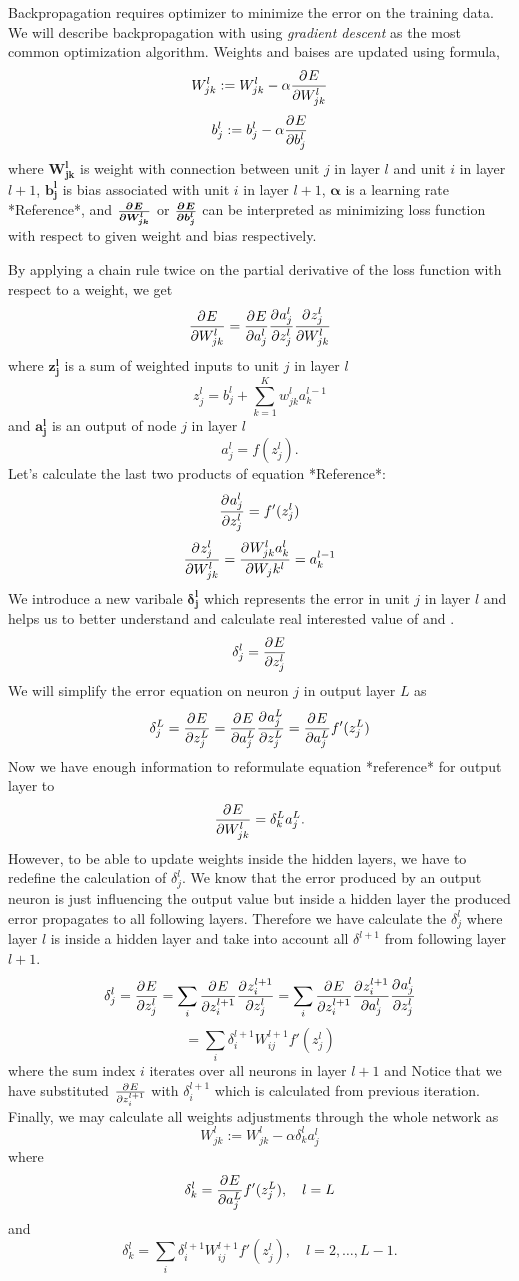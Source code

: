 Backpropagation requires optimizer to minimize the error on the training data.
We will describe backpropagation with using \textit{gradient descent} as the most common optimization algorithm.
\newline
Weights and baises are updated using formula,
\[  W_{jk}^l := W_{jk}^l - \alpha\frac{\partial^{} E}{\partial W_{jk}^l} \]
\[ b_j^l := b_j^l - \alpha\frac{\partial^{} E}{\partial b_j^l} \]
where $\boldsymbol{W_{jk}^l}$ is weight with connection between unit $j$ in layer $l$ and unit $i$ in layer $l+1$, $\boldsymbol{b_j^l}$ is bias associated with unit
$i$ in layer $l+1$, $\boldsymbol{\alpha}$ is a learning rate *Reference*, and $\boldsymbol{\frac{\partial^{} E}{\partial W_{jk}^l}}$ or $\boldsymbol{\frac{\partial^{} E}{\partial b_j^l}}$ can be interpreted as minimizing loss function with respect to given weight and bias respectively.
\par
By applying a chain rule twice on the partial derivative of the loss function with respect to a weight, we get
\[  \frac{\partial^{} E}{\partial W_{jk}^l} = \frac{\partial^{} E}{\partial a_j^l}\frac{\partial^{} a_j^l}{\partial z_j^l}\frac{\partial^{} z_j^l}{\partial W_{jk}^l} \]
where $\boldsymbol{z_j^l}$ is a sum of weighted inputs to unit $j$ in layer $l$
\[  z_j^l =  b_j^l + \sum_{k=1}^K {w_{jk}^l}{a_k^{l-1}}  \]
and $\boldsymbol{a_j^l}$ is an output of node $j$ in layer $l$
\[  a_j^l =  f(z_j^l).  \]
Let's calculate the last two products of equation *Reference*:
\[  \frac{\partial^{} a_j^l}{\partial z_j^l} = f'(z_j^l)  \]
\[  \frac{\partial^{} z_j^l}{\partial W_{jk}^l} = \frac{\partial^{} W_{jk}^{l}a_k^{l}}{\partial W_jk^l} = a_k^{l-1}  \]
We introduce a new varibale $\boldsymbol{\delta_j^l}$ which represents the error in unit $j$ in layer $l$ and helps us to better understand and calculate real interested value of  and .
\[  \delta_j^l = \frac{\partial^{} E}{\partial z_j^l} \]
We will simplify the error equation on neuron $j$ in output layer $L$ as
\[  \delta_j^L = \frac{\partial^{} E}{\partial z_j^L} = \frac{\partial^{} E}{\partial a_j^L}\frac{\partial^{} a_j^L}{\partial z_j^L} = \frac{\partial^{} E}{\partial a_j^L}f'(z_j^L)\]
Now we have enough information to reformulate equation *reference* for output layer to
\[ \frac{\partial^{} E}{\partial W_{jk}^l} = \delta_k^{L}a_j^L. \]
However, to be able to update weights inside the hidden layers, we have to redefine the calculation of $\delta_j^l$.
We know that the error produced by an output neuron is just influencing the output value but inside a hidden layer the produced error propagates to all following layers.
Therefore we have calculate the $\delta_j^l$ where layer $l$ is inside a hidden layer and take into account all $\delta^{l+1}$ from following layer $l+1$.
\[  \delta_j^l =  \frac{\partial^{} E}{\partial z_j^l} = \sum_i\frac{\partial^{} E}{\partial z_i^{l+1}}\frac{\partial^{} z_i^{l+1}}{\partial z_j^{l}} = \sum_i\frac{\partial^{} E}{\partial z_i^{l+1}}\frac{\partial^{} z_i^{l+1}}{\partial a_j^{l}}\frac{\partial^{} a_j^l}{\partial z_j^l} \]
\[  = \sum_i\delta_i^{l+1}W_{ij}^{l+1}f'(z_j^l) \]
where the sum index $i$ iterates over all neurons in layer $l+1$ and Notice that we have substituted $\frac{\partial^{} E}{\partial z_i^{l+1}}$ with $\delta_i^{l+1}$ which is calculated from previous iteration.
\newline
Finally, we may calculate all weights adjustments through the whole network as
\[  W_{jk}^l := W_{jk}^l - \alpha\delta_k^{l}a_j^l \]
where
\[ \delta_k^{l} = \frac{\partial^{} E}{\partial a_j^L}f'(z_j^L), \quad l = L \]
and
\[ \delta_k^{l} = \sum_i\delta_i^{l+1}W_{ij}^{l+1}f'(z_j^l), \quad l = 2,\ldots, L-1. \]

